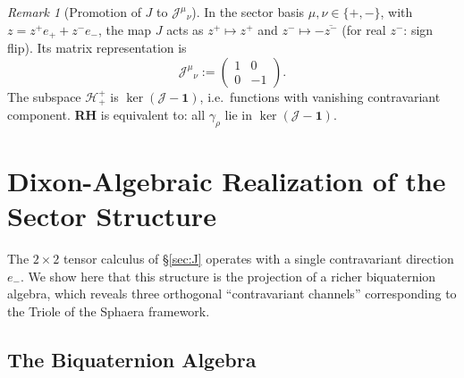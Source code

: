 \documentclass[12pt,a4paper]{article}
\theoremstyle{remark}
\newtheorem*{remark}{Remark}
\begin{document}
\begin{remark}[Promotion of $J$ to $\mathcal{J}^{\mu}{}_\nu$]
In the sector basis $\mu,\nu\in\{+,-\}$, with
$z=z^+e_++z^-e_-$, the map $J$ acts as $z^+\mapsto z^+$
and $z^-\mapsto-\overline{z^-}$ (for real $z^-$: sign flip).
Its matrix representation is
\[
\mathcal{J}^{\mu}{}_\nu
:= \begin{pmatrix}1&0\\0&-1\end{pmatrix}.
\]
The subspace $\mathcal{H}^+_+$ is $\ker(\mathcal{J}-\mathbf{1})$,
i.e.\ functions with vanishing contravariant component.
\textbf{RH} is equivalent to: all $\gamma_\rho$ lie in $\ker(\mathcal{J}-\mathbf{1})$.
\end{remark}


\section{Dixon-Algebraic Realization of the Sector Structure}
\label{sec:dixon}

The $2\times2$ tensor calculus of \S\ref{sec:J} operates with a single
contravariant direction $e_-$. 
We show here that this structure is the projection of a richer
biquaternion algebra, which reveals three orthogonal ``contravariant
channels'' corresponding to the Triole of the Sphaera framework.

\subsection*{The Biquaternion Algebra}
\end{document}
